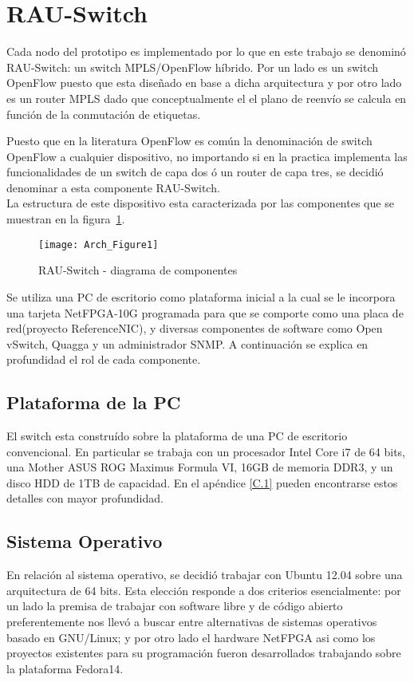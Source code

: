 \section{RAU-Switch}
Cada nodo del prototipo es implementado por lo que en este trabajo se denomin\'o RAU-Switch: un switch MPLS/OpenFlow híbrido. Por un lado es un switch OpenFlow puesto que esta dise\~nado en base a dicha arquitectura y por otro lado es un router MPLS dado que conceptualmente el el plano de reenvío se calcula en función de la conmutación de etiquetas.

Puesto que en la literatura OpenFlow es común la denominación de switch OpenFlow a cualquier dispositivo, no importando si en la practica implementa las funcionalidades de un switch de capa dos \'o un router de capa tres, se decidió denominar a esta componente RAU-Switch.\\

La estructura de este dispositivo esta caracterizada por las componentes que se muestran en la figura~\ref{fig:OpenSourceRArch}.

\begin{figure}[htbp!] 
\centering    
\texttt{[image: Arch\_Figure1]}
\caption[RAU-Switch - diagrama de componentes]{RAU-Switch - diagrama de componentes}
\label{fig:OpenSourceRArch}
\end{figure}

Se utiliza una PC de escritorio como plataforma inicial a la cual se le incorpora una tarjeta NetFPGA-10G programada para que se comporte como una placa de red(proyecto ReferenceNIC), y diversas componentes de software como Open vSwitch, Quagga y un administrador SNMP. A continuaci\'on se explica en profundidad el rol de cada componente.

\subsection{Plataforma de la PC}
El switch esta constru\'ido sobre la plataforma de una PC de escritorio convencional. En particular se trabaja con un procesador Intel Core i7 de 64 bits, una Mother ASUS ROG Maximus Formula VI, 16GB de memoria DDR3, y un disco HDD de 1TB de capacidad. En el apéndice \ref{C.1} pueden encontrarse estos detalles con mayor profundidad.

\subsection{Sistema Operativo}
En relación al sistema operativo, se decidió trabajar con Ubuntu 12.04 sobre una arquitectura de 64 bits. Esta elecci\'on responde a dos criterios esencialmente: por un lado la premisa de trabajar con software libre y de c\'odigo abierto preferentemente nos llev\'o a buscar entre alternativas de sistemas operativos basado en GNU/Linux; y por otro lado el hardware NetFPGA asi como los proyectos existentes para su programaci\'on fueron desarrollados trabajando sobre la plataforma Fedora14. 

